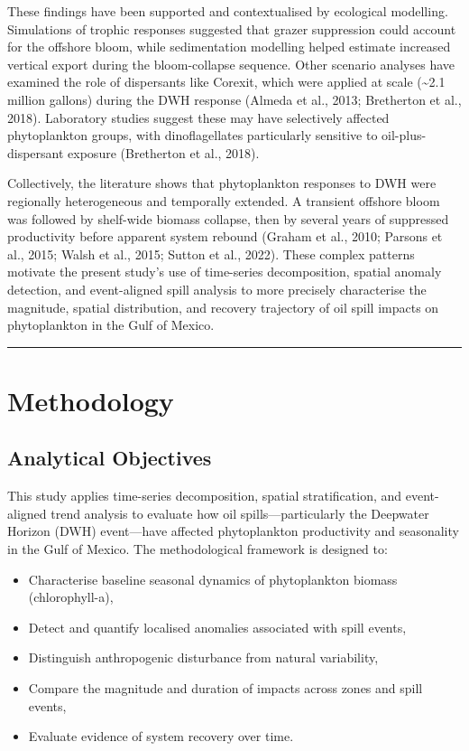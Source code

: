 \documentclass[
  11pt,
]{article}
\begin{document}
These findings have been supported and contextualised by ecological
modelling. Simulations of trophic responses suggested that grazer
suppression could account for the offshore bloom, while sedimentation
modelling helped estimate increased vertical export during the
bloom-collapse sequence. Other scenario analyses have examined the role
of dispersants like Corexit, which were applied at scale
(\textasciitilde2.1 million gallons) during the DWH response (Almeda et
al., 2013; Bretherton et al., 2018). Laboratory studies suggest these
may have selectively affected phytoplankton groups, with dinoflagellates
particularly sensitive to oil-plus-dispersant exposure (Bretherton et
al., 2018).

Collectively, the literature shows that phytoplankton responses to DWH
were regionally heterogeneous and temporally extended. A transient
offshore bloom was followed by shelf-wide biomass collapse, then by
several years of suppressed productivity before apparent system rebound
(Graham et al., 2010; Parsons et al., 2015; Walsh et al., 2015; Sutton
et al., 2022). These complex patterns motivate the present study's use
of time-series decomposition, spatial anomaly detection, and
event-aligned spill analysis to more precisely characterise the
magnitude, spatial distribution, and recovery trajectory of oil spill
impacts on phytoplankton in the Gulf of Mexico.

\begin{center}\rule{0.5\linewidth}{0.5pt}\end{center}

\section{\texorpdfstring{\textbf{Methodology}}{Methodology}}\label{methodology}

\subsection{Analytical Objectives}\label{analytical-objectives}

This study applies time-series decomposition, spatial stratification,
and event-aligned trend analysis to evaluate how oil
spills---particularly the Deepwater Horizon (DWH) event---have affected
phytoplankton productivity and seasonality in the Gulf of Mexico. The
methodological framework is designed to:

\begin{itemize}
\item
  Characterise baseline seasonal dynamics of phytoplankton biomass
  (chlorophyll-a),
\item
  Detect and quantify localised anomalies associated with spill events,
\item
  Distinguish anthropogenic disturbance from natural variability,
\item
  Compare the magnitude and duration of impacts across zones and spill
  events,
\item
  Evaluate evidence of system recovery over time.
\end{itemize}
\end{document}
